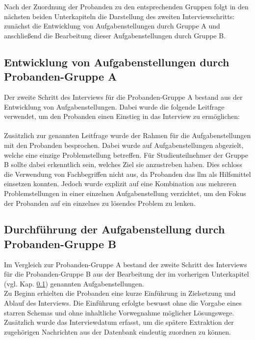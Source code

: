 Nach der Zuordnung der Probanden zu den entsprechenden Gruppen folgt in den nächsten beiden Unterkapiteln die Darstellung des zweiten Interviewschritts: 
zunächst die Entwicklung von Aufgabenstellungen durch Gruppe A und anschließend die Bearbeitung dieser Aufgabenstellungen durch Gruppe B.

\subsection{Entwicklung von Aufgabenstellungen durch Probanden-Gruppe A}
\label{sec:aufgabenstellung-gruppe-a}

Der zweite Schritt des Interviews für die Probanden-Gruppe A bestand aus der Entwicklung von Aufgabenstellungen. 
Dabei wurde die folgende Leitfrage verwendet, um den Probanden einen Einstieg in das Interview zu ermöglichen: \\

 \\

Zusätzlich zur genannten Leitfrage wurde der Rahmen für die Aufgabenstellungen mit den Probanden besprochen. 
Dabei wurde auf Aufgabenstellungen abgezielt, welche eine einzige Problemstellung betreffen.
Für Studienteilnehmer der Gruppe B sollte dabei erkenntlich sein, welches Ziel sie anzustreben haben. 
Dies schloss die Verwendung von Fachbegriffen nicht aus, da Probanden das \gls{llm} als Hilfsmittel einsetzen konnten.
Jedoch wurde explizit auf eine Kombination aus mehreren Problemstellungen in einer einzelnen Aufgabenstellung verzichtet, 
um den Fokus der Probanden auf ein einzelnes zu lösendes Problem zu lenken.

\subsection{Durchführung der Aufgabenstellung durch Probanden-Gruppe B}
\label{sec:aufgabenstellung-gruppe-b}
Im Vergleich zur Probanden-Gruppe A bestand der zweite Schritt des Interviews für die Probanden-Gruppe B aus der Bearbeitung der im vorherigen Unterkapitel (vgl. Kap. \ref{sec:aufgabenstellung-gruppe-a}) genannten Aufgabenstellungen. \\

Zu Beginn erhielten die Probanden eine kurze Einführung in Zielsetzung und Ablauf des Interviews. Die Einführung erfolgte bewusst ohne die Vorgabe eines starren Schemas und ohne inhaltliche Vorwegnahme möglicher Lösungswege. 
Zusätzlich wurde das Interviewdatum erfasst, um die spätere Extraktion der zugehörigen Nachrichten aus der Datenbank eindeutig zuordnen zu können. \\

